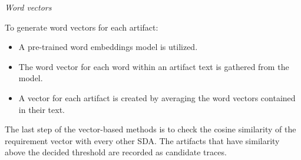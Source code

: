 \documentclass[conference]{IEEEtran}
\begin{document}
\pagebreak

\textit{Word vectors}

To generate word vectors for each artifact:

\begin{itemize}
    \item A pre-trained word embeddings model is utilized.
    \item The word vector for each word within an artifact text is gathered from the model.
    \item A vector for each artifact is created by averaging the word vectors contained in their text.
\end{itemize}


The last step of the vector-based methods is to check the cosine similarity of the requirement vector with every other SDA. The artifacts that have similarity above the decided threshold are recorded as candidate traces.

\end{document}

